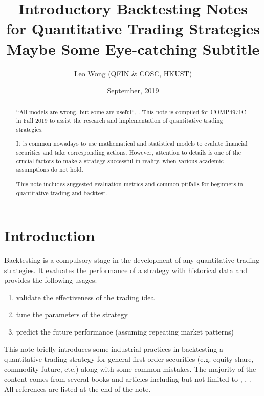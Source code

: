 \documentclass[12pt]{article}
\title{Introductory Backtesting Notes \\ for Quantitative Trading Strategies \\[2ex]
  \large Maybe Some Eye-catching Subtitle}
\author{Leo Wong (QFIN \& COSC, HKUST)}
\date{September, 2019}
\begin{document}
\begin{titlingpage}
  \maketitle
  \begin{abstract}
    \enquote{All models are wrong, but some are useful}, \cite{allmodelsarewrong}. This note is compiled for COMP4971C in Fall 2019 to assist the research and implementation of quantitative trading strategies.

    It is common nowadays to use mathematical and statistical models to evalute financial securities and take corresponding actions. However, attention to details is one of the crucial factors to make a strategy successful in reality, when various academic assumptions do not hold.

    This note includes suggested evaluation metrics and common pitfalls for beginners in quantitative trading and backtest.
  \end{abstract}
\end{titlingpage}


\tableofcontents

\section{Introduction}

Backtesting is a compulsory stage in the development of any quantitative trading strategies. It evaluates the performance of a strategy with historical data and provides the following usages:

\begin{enumerate}
  \item validate the effectiveness of the trading idea
  \item tune the parameters of the strategy
  \item predict the future performance (assuming repeating market patterns)
\end{enumerate}

This note briefly introduces some industrial practices in backtesting a quantitative trading strategy for general first order securities (e.g. equity share, commodity future, etc.) along with some common mistakes. The majority of the content comes from several books and articles including but not limited to \cite{insideblackbox}, \cite{succalgotrading}, \cite{epchan2008}. All references are listed at the end of the note.
\end{document}
